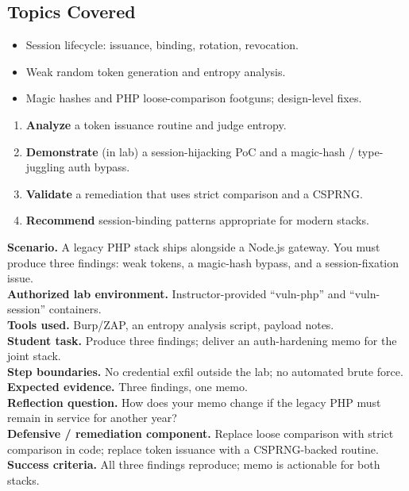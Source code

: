 \documentclass[11pt,letterpaper,oneside]{report}
\begin{document}
\subsection*{Topics Covered}
\begin{itemize}
  \item Session lifecycle: issuance, binding, rotation, revocation.
  \item Weak random token generation and entropy analysis.
  \item Magic hashes and PHP loose-comparison footguns; design-level fixes.
\end{itemize}

\begin{outcomes}
\begin{enumerate}
  \item \textbf{Analyze} a token issuance routine and judge entropy.
  \item \textbf{Demonstrate} (in lab) a session-hijacking PoC and a magic-hash / type-juggling auth bypass.
  \item \textbf{Validate} a remediation that uses strict comparison and a CSPRNG.
  \item \textbf{Recommend} session-binding patterns appropriate for modern stacks.
\end{enumerate}
\end{outcomes}

\begin{labbox}
\textbf{Scenario.} A legacy PHP stack ships alongside a Node.js gateway. You must produce three findings: weak tokens, a magic-hash bypass, and a session-fixation issue.\\[3pt]
\textbf{Authorized lab environment.} Instructor-provided ``vuln-php'' and ``vuln-session'' containers.\\[3pt]
\textbf{Tools used.} Burp/ZAP, an entropy analysis script, payload notes.\\[3pt]
\textbf{Student task.} Produce three findings; deliver an auth-hardening memo for the joint stack.\\[3pt]
\textbf{Step boundaries.} No credential exfil outside the lab; no automated brute force.\\[3pt]
\textbf{Expected evidence.} Three findings, one memo.\\[3pt]
\textbf{Reflection question.} How does your memo change if the legacy PHP must remain in service for another year?\\[3pt]
\textbf{Defensive / remediation component.} Replace loose comparison with strict comparison in code; replace token issuance with a CSPRNG-backed routine.\\[3pt]
\textbf{Success criteria.} All three findings reproduce; memo is actionable for both stacks.
\end{labbox}
\end{document}
